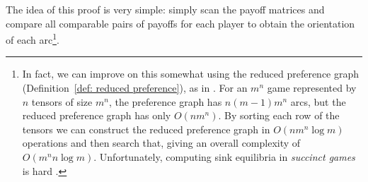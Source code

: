 \documentclass[preprint,authoryear]{elsarticle}
\begin{document}
The idea of this proof is very simple: simply scan the payoff matrices and compare all comparable pairs of payoffs for each player to obtain the orientation of each arc\footnote{In fact, we can improve on this somewhat using the reduced preference graph (Definition~\ref{def: reduced preference}), as in \cite{hakim2024swim}. For an $m^n$ game represented by $n$ tensors of size $m^n$, the preference graph has $n(m-1)m^n$ arcs, but the reduced preference graph has only $O(nm^n)$. By sorting each row of the tensors we can construct the reduced preference graph in $O(nm^n\log m)$ operations and then search that, giving an overall complexity of $O(m^nn\log m)$. Unfortunately, computing sink equilibria in \emph{succinct games} is hard \citep{fabrikant_complexity_2004,fabrikant2008complexity}.}.





\end{document}
